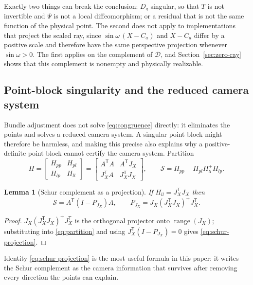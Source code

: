 \documentclass[11pt,a4paper]{article}
\newtheorem{lemma}[theorem]{Lemma}
\theoremstyle{definition}
\theoremstyle{remark}
\newcommand{\T}{\mathsf{T}}
\begin{document}
Exactly two things can break the conclusion: $D_q$ singular, so that $T$ is not invertible and $\Psi$ is not a local diffeomorphism; or a residual that is not the same function of the physical point. The second does not apply to implementations that project the scaled ray, since $\sin\omega\,(X-C_a)$ and $X-C_a$ differ by a positive scale and therefore have the same perspective projection whenever $\sin\omega>0$. The first applies on the complement of $\mathcal D$, and Section~\ref{sec:zero-ray} shows that this complement is nonempty and physically realizable.

\subsection{Point-block singularity and the reduced camera system}
\label{sec:schur}

Bundle adjustment does not solve \eqref{eq:congruence} directly: it eliminates the points and solves a reduced camera system. A singular point block might therefore be harmless, and making this precise also explains why a positive-definite point block cannot certify the camera system. Partition
\begin{equation}
H=\begin{bmatrix}H_{pp}&H_{pl}\\H_{lp}&H_{ll}\end{bmatrix}
=\begin{bmatrix}A^{\T}A&A^{\T}J_X\\J_X^{\T}A&J_X^{\T}J_X\end{bmatrix},
\qquad
\mathcal S=H_{pp}-H_{pl}H_{ll}^{+}H_{lp}.
\label{eq:partition}
\end{equation}

\begin{lemma}[Schur complement as a projection]\label{lem:schur}
If $H_{ll}=J_X^{\T}J_X$ then
\begin{equation}
\mathcal S=A^{\T}(I-P_{J_X})A,
\qquad
P_{J_X}=J_X(J_X^{\T}J_X)^{+}J_X^{\T}.
\label{eq:schur-projection}
\end{equation}
\end{lemma}
\begin{proof}
$J_X(J_X^{\T}J_X)^{+}J_X^{\T}$ is the orthogonal projector onto $\operatorname{range}(J_X)$; substituting into \eqref{eq:partition} and using $J_X^{\T}(I-P_{J_X})=0$ gives \eqref{eq:schur-projection}.
\end{proof}

Identity \eqref{eq:schur-projection} is the most useful formula in this paper: it writes the Schur complement as the camera information that survives after removing every direction the points can explain.
\end{document}
